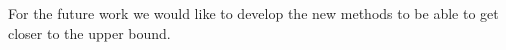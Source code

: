 \documentclass{book}
\begin{document}
For the future work we would like to develop the new methods to be able to get closer to the upper bound.

% 
% 
% 



















\end{document}
